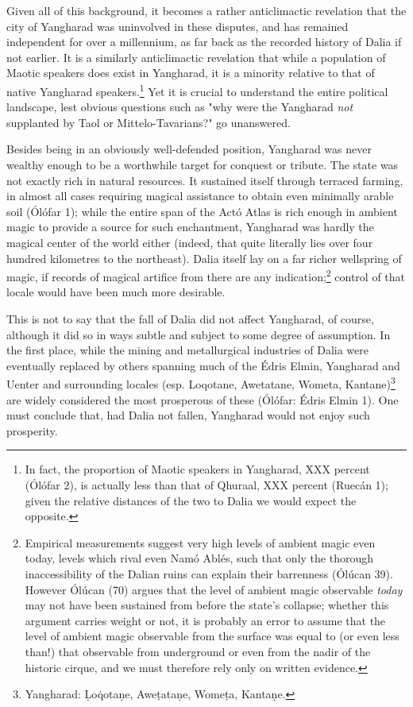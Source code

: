 \documentclass{article}
\begin{document}
{Given all of this background, it becomes a rather anticlimactic revelation that the city of Yangharad was uninvolved in these disputes, and has remained
independent for over a millennium, as far back as the recorded history of Dalia if not earlier. It is a similarly anticlimactic revelation that while a population of Maotic speakers does exist in Yangharad, it is a minority relative to that of native Yangharad speakers.\footnote{In fact, the proportion of Maotic speakers in Yangharad, XXX percent (Ólófar 2), is actually less than that of Qhuraal, XXX percent (Ruecán 1); given the relative distances of the two to Dalia we would expect the opposite.} Yet it is crucial to understand the entire political landscape, lest obvious questions such as "why were the Yangharad \emph{not} supplanted by Taol or Mittelo-Tavarians?" go unanswered.


Besides being in an obviously well-defended position, Yangharad was never
wealthy enough to be a worthwhile target for conquest or tribute. The state was not exactly rich in natural resources. It sustained itself through terraced farming, in almost all cases requiring magical assistance to obtain even minimally arable soil (Ólófar 1); while the entire span of the Actó Atlas is rich enough in ambient magic to provide a source for such enchantment, Yangharad was hardly the magical center of the world either (indeed, that quite literally lies over four hundred kilometres to the northeast). Dalia itself lay on a far richer wellspring of magic, if records of magical artifice from there are any indication;\footnote{Empirical measurements suggest very high levels of ambient magic even today, levels which rival even Namó Ablés, such that only the thorough inaccessibility of the Dalian ruins can explain their barrenness (Ólúcan 39). However Ólúcan (70) argues that the level of ambient magic observable \emph{today} may not have been sustained from before the state's collapse; whether this argument carries weight or not, it is probably an error to assume that the level of ambient magic observable from the surface was equal to (or even less than!) that observable from underground or even from the nadir of the historic cirque, and we must therefore rely only on written evidence.} control of that locale would have been much more desirable.

This is not to say that the fall of Dalia did not affect Yangharad, of course, although it did so in ways subtle and subject to some degree of assumption. In the first place, while the mining and metallurgical industries of Dalia were eventually replaced by others spanning much of the Édris Elmin, Yangharad and Uenter and surrounding locales (esp. Loqotane, Awetatane, Wometa, Kantane)\footnote{Yangharad: \d{L}o\.{q}ota\d{n}e, Awe\d{t}ata\d{n}e, Wome\d{t}a, Kanta\d{n}e.} are widely considered the most prosperous of these (Ólófar: Édris Elmin 1). One must conclude that, had Dalia not fallen, Yangharad would not enjoy such prosperity.

}
\end{document}
